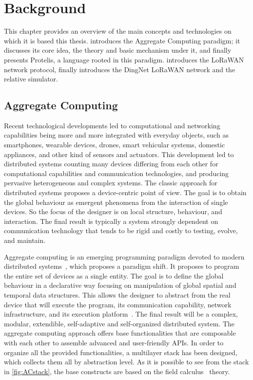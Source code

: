 \chapter{Background}
\label{chap:background}
This chapter provides an overview of the main concepts and technologies on which it is based this thesis.  introduces the Aggregate Computing paradigm; it discusses its core idea, the theory and basic mechanism under it, and finally presents Protelis, a language rooted in this paradigm. 
 introduces the LoRaWAN network protocol, 
finally  introduces the DingNet LoRaWAN network and the relative simulator. 

\section{Aggregate Computing}
\label{sec:AC}
Recent technological developments led to computational and networking capabilities being more and more integrated with everyday objects, such as smartphones, wearable devices, drones, smart vehicular systems, domestic appliances, and other kind of sensors and actuators.
% 
This development led to distributed systems counting many devices differing from each other for computational capabilities and communication technologies, and producing pervasive heterogeneous and complex systems.
% 
The classic approach for distributed systems proposes a device-centric point of view.
% 
The goal is to obtain the global behaviour as emergent phenomena from the interaction of single devices. 
% 
So the focus of the designer is on local structure, behaviour, and interaction. 
% 
The final result is typically a system strongly dependent on communication technology that tends to be rigid and costly to testing, evolve, and maintain.
 
Aggregate computing is an emerging programming paradigm devoted to modern distributed systems~\cite{BealIEEEComputer2015}, which proposes a paradigm shift. 
% 
It proposes to program the entire set of devices as a single entity.
% 
The goal is to define the global behaviour in a declarative way focusing on manipulation of global spatial and temporal data structures. This allows the designer to abstract from the real device that will execute the program, its communication capability, network infrastructure, and its execution platform~\cite{ViroliUbiComp2016}. 
% 
The final result will be a complex, modular, extendible, self-adaptive and self-organized distributed system.
% 
The aggregate computing approach offers base functionalities that are composable with each other to assemble advanced and user-friendly APIs. 
In order to organize all the provided functionalities, a multilayer stack has been designed, which collects them all by abstraction level. 
As it is possible to see from the stack in \autoref{fig:ACstack}, the base constructs are based on the field calculus~\cite{Audrito2019} theory.

